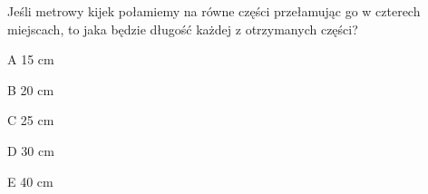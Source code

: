 \begin{tresc}
Jeśli metrowy kijek połamiemy na równe części przełamując go w czterech miejscach, to jaka będzie długość każdej z otrzymanych części?
\end{tresc}
\begin{wariant}{A} 15 cm \end{wariant}
\begin{wariant}{B} 20 cm \end{wariant}
\begin{wariant}{C} 25 cm \end{wariant}
\begin{wariant}{D} 30 cm \end{wariant}
\begin{wariant}{E} 40 cm \end{wariant}
